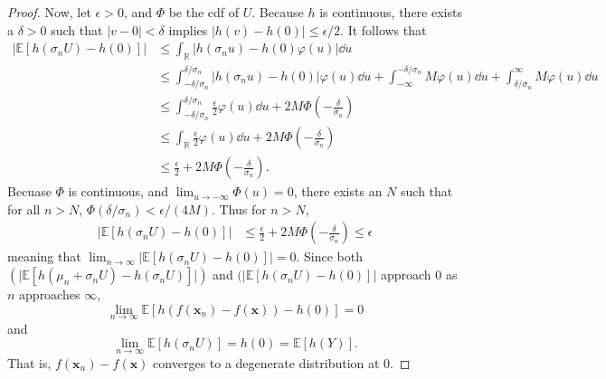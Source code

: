 \begin{proof}
    Now, let $\epsilon > 0$, and $\Phi$ be the cdf of $U$.
    Because $h$ is continuous, there exists a $\delta > 0$ such that
    $ \lvert v - 0 \rvert < \delta $ implies $\lvert h(v) - h(0)\rvert \leq \epsilon / 2$.
    It follows that
    \begin{align*}
        \lvert \mathbb{E}[h(\sigma_n U) - h(0)] \rvert
        & \leq
        \int_{\mathbb{R}} \lvert h(\sigma_n u) - h(0) \varphi(u) \lvert \dd u \\
        & \leq
        \int_{-\delta / \sigma_n}^{\delta / \sigma_n} \lvert h(\sigma_n u) - h(0) \rvert \varphi(u) \dd u
        + \int_{-\infty}^{-\delta / \sigma_n}
        M \varphi(u) \dd u +
        \int_{\delta / \sigma_n}^{\infty}
        M \varphi(u) \dd u \\
        & \leq \int_{-\delta / \sigma_n}^{\delta / \sigma_n}
         \frac{\epsilon}2 \varphi(u) \dd u + 2M \Phi\left(-\frac{ \delta }{ \sigma_n }\right) \\
        & \leq \int_{\mathbb{R}}  \frac{\epsilon}2 \varphi(u) \dd u + 2M \Phi\left(-\frac{ \delta }{ \sigma_n }\right) \\
        & \leq \frac\epsilon2 + 2M \Phi\left(-\frac{ \delta }{ \sigma_n }\right).
    \end{align*}
    Becuase $\Phi$ is continuous, and $\lim_{u \to -\infty}\Phi(u) = 0$, there exists an $N$ such that for all $n > N$, $\Phi(\delta/\sigma_n) < \epsilon / (4M)$.
    Thus for $n > N$,
    \begin{align*}
        \lvert \mathbb{E}[h(\sigma_n U) - h(0)] \rvert
        & \leq \frac\epsilon2
        + 2M \Phi\left(-\frac{ \delta }{ \sigma_n }\right)
        \leq \epsilon
    \end{align*}
    meaning that $\lim_{n \to \infty} \lvert \mathbb{E}[h(\sigma_n U) - h(0)] \rvert = 0.$
    Since both $(\lvert \mathbb{E}[h(\mu_n + \sigma_n U) - h(\sigma_n U)] \rvert)$ and $(\lvert \mathbb{E}[h(\sigma_nU) - h(0)] \rvert$ approach 0 as $n$ approaches $\infty$,
    \begin{equation*}
        \lim_{n \to \infty}  \mathbb{E}[h(f(\mathbf{x}_n) - f(\mathbf{x})) - h(0)]  = 0
    \end{equation*}
    and
    \begin{equation*}
        \lim_{n \to \infty}  \mathbb{E}[h(\sigma_n U)]  = h(0) = \mathbb{E}[h(Y)].
    \end{equation*}
    That is, $f(\mathbf{x}_n) - f(\mathbf{x})$ converges to a degenerate distribution at 0.
\end{proof}

